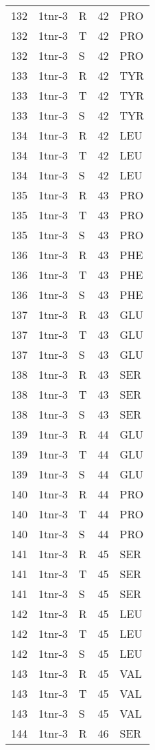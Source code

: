 \begin{tiny}
\begin{longtable}[l]{l|l|l|l|l}
	132 & 1tnr-3 & R & 42 & PRO \\
	132 & 1tnr-3 & T & 42 & PRO \\
	132 & 1tnr-3 & S & 42 & PRO \\
	133 & 1tnr-3 & R & 42 & TYR \\
	133 & 1tnr-3 & T & 42 & TYR \\
	133 & 1tnr-3 & S & 42 & TYR \\
	134 & 1tnr-3 & R & 42 & LEU \\
	134 & 1tnr-3 & T & 42 & LEU \\
	134 & 1tnr-3 & S & 42 & LEU \\
	135 & 1tnr-3 & R & 43 & PRO \\
	135 & 1tnr-3 & T & 43 & PRO \\
	135 & 1tnr-3 & S & 43 & PRO \\
	136 & 1tnr-3 & R & 43 & PHE \\
	136 & 1tnr-3 & T & 43 & PHE \\
	136 & 1tnr-3 & S & 43 & PHE \\
	137 & 1tnr-3 & R & 43 & GLU \\
	137 & 1tnr-3 & T & 43 & GLU \\
	137 & 1tnr-3 & S & 43 & GLU \\
	138 & 1tnr-3 & R & 43 & SER \\
	138 & 1tnr-3 & T & 43 & SER \\
	138 & 1tnr-3 & S & 43 & SER \\
	139 & 1tnr-3 & R & 44 & GLU \\
	139 & 1tnr-3 & T & 44 & GLU \\
	139 & 1tnr-3 & S & 44 & GLU \\
	140 & 1tnr-3 & R & 44 & PRO \\
	140 & 1tnr-3 & T & 44 & PRO \\
	140 & 1tnr-3 & S & 44 & PRO \\
	141 & 1tnr-3 & R & 45 & SER \\
	141 & 1tnr-3 & T & 45 & SER \\
	141 & 1tnr-3 & S & 45 & SER \\
	142 & 1tnr-3 & R & 45 & LEU \\
	142 & 1tnr-3 & T & 45 & LEU \\
	142 & 1tnr-3 & S & 45 & LEU \\
	143 & 1tnr-3 & R & 45 & VAL \\
	143 & 1tnr-3 & T & 45 & VAL \\
	143 & 1tnr-3 & S & 45 & VAL \\
	144 & 1tnr-3 & R & 46 & SER \\

\end{longtable}
\end{tiny}
